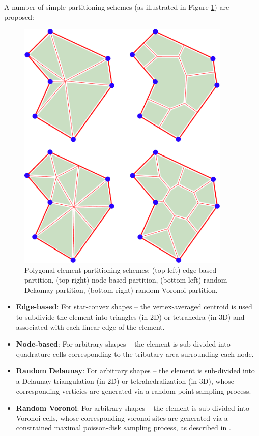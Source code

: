 	A number of simple partitioning schemes (as illustrated in Figure \ref{fig:partitioning_types}) are proposed:
	\begin{figure} [!ht]
		\centering
		\includegraphics[width = 4.0in]{figures/partition_types.pdf}
		\caption{Polygonal element partitioning schemes: (top-left) edge-based partition, (top-right) node-based partition, (bottom-left) random Delaunay partition, (bottom-right) random Voronoi partition.}
		\label{fig:partitioning_types}
	\end{figure}
	\begin{itemize}
		\item \textbf{Edge-based}: For star-convex shapes -- the vertex-averaged centroid is used to subdivide the element into triangles (in 2D) or tetrahedra (in 3D) and associated with each linear edge of the element.
		\item \textbf{Node-based}: For arbitrary shapes -- the element is sub-divided into quadrature cells corresponding to the tributary area surrounding each node.
		\item \textbf{Random Delaunay}: For arbitrary shapes -- the element is sub-divided into a Delaunay triangulation (in 2D) or tetrahedralization (in 3D), whose corresponding verticies are generated via a random point sampling process.
		\item \textbf{Random Voronoi}: For arbitrary shapes -- the element is sub-divided into Voronoi cells, whose corresponding voronoi sites are generated via a constrained maximal poisson-disk sampling process, as described in \cite{Ebeida:11}.
	\end{itemize}
	
